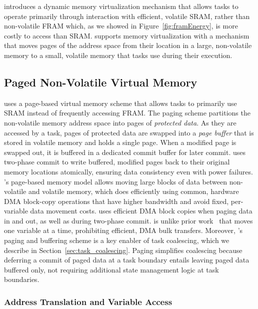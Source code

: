 \sys introduces a dynamic memory virtualization mechanism that allows tasks to operate primarily through interaction with efficient, volatile SRAM, rather than non-volatile FRAM which, as we showed in Figure~\ref{fig:framEnergy}, is more costly to access than SRAM. \sys supports memory virtualization with a mechanism that moves pages of the address space from their location in a large, non-volatile memory to a small, volatile memory that tasks use during their execution.

\subsection{Paged Non-Volatile Virtual Memory} 

\sys uses a page-based virtual memory scheme that allows tasks to primarily use SRAM instead of frequently accessing FRAM. The paging scheme partitions the non-volatile memory address space into pages of {\em protected data}. As they are accessed by a task, pages of protected data are swapped into a {\em page buffer} that is stored in volatile memory and holds a single page. When a modified page is swapped out, it is buffered in a dedicated commit buffer for later commit. \sys uses two-phase commit to write buffered, modified pages back to their original memory locations atomically, ensuring data consistency even with power failures. \sys's page-based memory model allows moving large blocks of data between non-volatile and volatile memory, which \sys does efficiently using common,
hardware DMA block-copy operations that have higher bandwidth and avoid fixed, 
per-variable data movement costs. \sys uses efficient DMA block copies when paging data in and out, as well as during two-phase commit. \sys is unlike prior work~\cite{chain,alpaca} that moves one variable at a time, prohibiting efficient, DMA bulk transfers. Moreover, \sys's paging and buffering scheme is a key enabler of task coalescing, which we describe in Section~\ref{sec:task_coalescing}. Paging simplifies coalescing because deferring a commit of paged data at a task boundary entails leaving paged data buffered only, not requiring additional state management logic at task boundaries.

\subsubsection{Address Translation and Variable Access}


